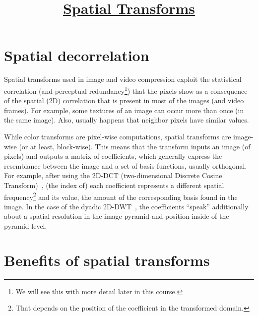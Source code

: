 
\title{\href{https://sistemas-multimedia.github.io/contents/spatial_transforms/}{Spatial Transforms}}

\maketitle

\tableofcontents

\section{Spatial decorrelation}

Spatial transforms used in image and video compression exploit the
statistical correlation (and perceptual redundancy\footnote{We will
  see this with more detail later in this course.}) that the pixels
show as a consequence of the spatial (2D) correlation that is present
in most of the images (and video frames). For example, some textures of
an image can occur more than once (in the same image). Also, usually
happens that neighbor pixels have similar values.

While color transforms are pixel-wise computations, spatial transforms
are image-wise (or at least, block-wise). This means that the
transform inputs an image (of pixels) and outputs a matrix of
coefficients, which generally express the resemblance between the
image and a set of basis functions, usually orthogonal. For example,
after using the 2D-DCT (two-dimensional Discrete Cosine
Transform)~\cite{vruiz__DCT}, (the index of) each coefficient
represents a different spatial frequency\footnote{That depends on the
  position of the coefficient in the transformed domain.} and its
value, the amount of the corresponding basis found in the image. In
the case of the dyadic 2D-DWT~\cite{vruiz__DWT}, the coefficients
``speak'' additionally about a spatial resolution in the image pyramid
and position inside of the pyramid level.


\section{Benefits of spatial transforms}

